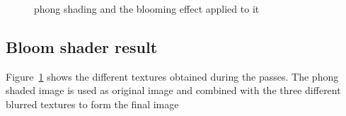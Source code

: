 \documentclass[a4paper,12pt]{article}
\begin{document}
\begin{figure}[h]
\begin{center}
{       \quad
      }
    \caption{phong shading and the blooming effect applied to it}
    \label{fig:bloomPassShading}
  \end{center}
\end{figure}

\subsection{Bloom shader result}
\label{sec:bloomShaderResult}
Figure~\ref{fig:bloomPassShading} shows the different textures obtained during the passes. The phong shaded image is used as original image and combined with the three different blurred textures to form the final image
\end{document}
